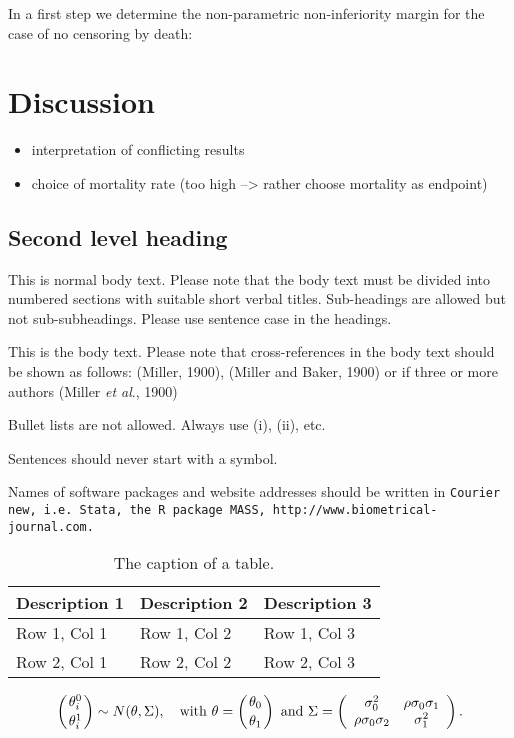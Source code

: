 \documentclass[bimj,fleqn]{w-art}\usepackage[]{graphicx}\usepackage[]{color}
\theoremstyle{plain}
\theoremstyle{definition}
\begin{document}
	In a first step we determine the non-parametric non-inferiority margin for the case of no censoring
	by death:


  \section{Discussion}
  \label{sec:Discussion}
  \begin{itemize}
  \item interpretation of conflicting results
  \item choice of mortality rate (too high --> rather choose mortality as endpoint)
\end{itemize}



  \subsection{Second level heading}
  This is normal body text. Please note that the body text must be divided into numbered sections with
  suitable short verbal titles. Sub-headings are allowed but not sub-subheadings. Please use sentence case in the
  headings.

  This is the body text. Please note that cross-references in the body text should be shown as follows:
  (Miller, 1900), (Miller and Baker, 1900) or if three or more authors (Miller {\it{et al}}., 1900)
  \vspace*{12pt}

  \noindent Bullet lists are not allowed. Always use (i), (ii), etc.
  \vspace*{12pt}

  \noindent Sentences should never start with a symbol.
  \vspace*{12pt}

  \noindent Names of software packages and website addresses should be written in {\tt{Courier new, i.e. Stata, the R package
  MASS, http://www.biometrical-journal.com.}}


  \begin{table}[htb]
  \begin{center}
  \caption{The caption of a table.}
  \begin{tabular}{lll}
  \hline
  Description 1 & Description 2 & Description 3\\
  \hline
  Row 1, Col 1 & Row 1, Col 2 & Row 1, Col 3\\
  Row 2, Col 1 & Row 2, Col 2 & Row 2, Col 3\\
  \hline
  \end{tabular}
  \end{center}
  \end{table}
  \begin{equation}
  \left({\theta^{0}_{i}}\atop{\theta^{1}_{i}}\right) \sim N(\theta,\Sigma),\quad {\mathrm{with}}\
  {{\theta}} = \left({\theta_{0}}\atop{\theta_{1}}\right)\ {\mathrm{and}}\ \Sigma =
  \left(\begin{array}{cc}
  \sigma^{2}_{0} & \rho\sigma_{0}\sigma_{1}\\
  \rho\sigma_{0}\sigma_{2} & \sigma^{2}_{1}
  \end{array}\right).
  \end{equation}
\end{document}
